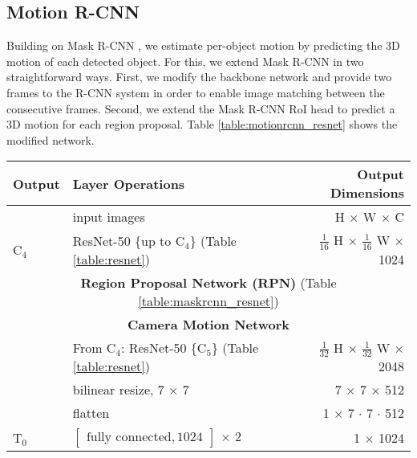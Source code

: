 
\subsection{Motion R-CNN}
\label{ssec:model}

Building on Mask R-CNN \cite{MaskRCNN},
we estimate per-object motion by predicting the 3D motion of each detected object.
For this, we extend Mask R-CNN in two straightforward ways.
First, we modify the backbone network and provide two frames to the R-CNN system
in order to enable image matching between the consecutive frames.
Second, we extend the Mask R-CNN RoI head to predict a 3D motion for each
region proposal. Table \ref{table:motionrcnn_resnet} shows the modified network.

{
\begin{table}[h]
\centering
\begin{tabular}{llr}
\toprule
\textbf{Output} & \textbf{Layer Operations} & \textbf{Output Dimensions} \\
\midrule\midrule
& input images & H $\times$ W $\times$ C \\
\midrule
C$_4$ & ResNet-50 \{up to C$_4$\} (Table \ref{table:resnet}) & $\tfrac{1}{16}$ H $\times$ $\tfrac{1}{16}$ W $\times$ 1024 \\
\midrule
\multicolumn{3}{c}{\textbf{Region Proposal Network (RPN)} (Table \ref{table:maskrcnn_resnet})}\\
\midrule
\multicolumn{3}{c}{\textbf{Camera Motion Network}}\\
\midrule
& From C$_4$: ResNet-50 \{C$_5$\} (Table \ref{table:resnet}) & $\tfrac{1}{32}$ H $\times$ $\tfrac{1}{32}$ W $\times$ 2048 \\
& bilinear resize, 7 $\times$ 7 & 7 $\times$ 7 $\times$ 512 \\
& flatten & 1 $\times$ 7 $\cdot$ 7 $\cdot$ 512 \\
T$_0$ & $\begin{bmatrix}\textrm{fully connected}, 1024\end{bmatrix}$ $\times$ 2  & 1 $\times$ 1024 \\


\end{tabular}
\end{table}}
